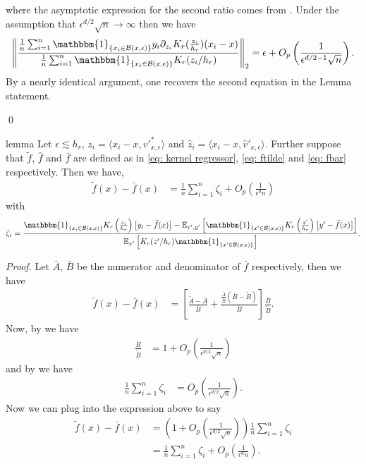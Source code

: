 \documentclass[11pt]{article}
\begin{document}
where the asymptotic expression for the second ratio comes from . Under the assumption that $\epsilon^{d/2}\sqrt{n} \rightarrow \infty$ then we have 
\begin{align}
    \left\|\frac{\frac{1}{n}\sum_{i = 1}^n\mathbbm{1}_{\{x_i \in \mathcal{B}(x, \epsilon)\}}y_i\partial_{z_i}K_r(\frac{z_i}{h_r})(x_i - x)}{\frac{1}{n}\sum_{i = 1}^n\mathbbm{1}_{\{x_i \in \mathcal{B}(x, \epsilon)\}}K_r(z_i/h_r)}\right\|_2 = \epsilon + O_p\left(\frac{1}{\epsilon^{d/2-1}\sqrt{n}}\right).
\end{align}
By a nearly identical argument, one recovers the second equation in the Lemma statement.

\qed{}

\begin{restatable}{lemma}{} \label{lemma: ftilde minus fbar}
    Let $\epsilon \lesssim h_r$, $z_i = \langle x_i - x, v'^*_{x, \epsilon}\rangle$ and $\hat{z}_i = \langle x_i - x, \hat{v}'_{x, \epsilon}\rangle$. Further suppose that $\tilde{f}$, $\hat{f}$ and $\bar{f}$ are defined as in \cref{eq: kernel regressor}, \cref{eq: ftilde} and \cref{eq: fbar} respectively. Then we have,
    \begin{align}
        \tilde{f}(x) - \bar{f}(x) &= \frac{1}{n}\sum_{i = 1}^n\zeta_i + O_p\left(\frac{1}{\epsilon^{d}n}\right) 
    \end{align}
    with 
    \begin{equation}
        \zeta_i = \frac{\mathbbm{1}_{\{x_i \in \mathcal{B}(x, \epsilon)\}}K_r\left(\frac{z_i}{h_r}\right)\left[y_i - \bar{f}(x)\right] - \mathbb{E}_{x', y'}\left[\mathbbm{1}_{\{x' \in \mathcal{B}(x, \epsilon)\}}K_r\left(\frac{z'}{h_r}\right)\left[y' - \bar{f}(x)\right]\right]}{\mathbb{E}_{x'}\left[K_r(z'/h_r)\mathbbm{1}_{\{x'\in \mathcal{B}(x, \epsilon)\}}\right]}. \label{eq: zeta definition}
    \end{equation}
\end{restatable}
\noindent \textit{Proof.} Let $\bar{A}$, $\bar{B}$ be the numerator and denominator of $\bar{f}$ respectively, then we have
\begin{align}
    \tilde{f}(x) - \bar{f}(x) &=  \left[\frac{\tilde{A}-\bar{A}}{\bar{B}} + \frac{\frac{\bar{A}}{\bar{B}}\left(\bar{B} - \tilde{B}\right)}{\bar{B}}\right]\frac{\bar{B}}{\tilde{B}}. 
\end{align}
Now, by  we have
\begin{align}
    \frac{\bar{B}}{\tilde{B}} &= 1 + O_p\left(\frac{1}{\epsilon^{d/2}\sqrt{n}}\right)
\end{align}
and by  we have
\begin{align}
     \frac{1}{n} \sum_{i = 1}^n \zeta_i&=  O_p\left(\frac{1}{\epsilon^{d/2}\sqrt{n}}\right).
\end{align}
Now we can plug into the expression above to say
\begin{align}
    \tilde{f}(x) - \bar{f}(x) &= \left(1 + O_p\left(\frac{1}{\epsilon^{d/2}\sqrt{n}}\right)\right)\frac{1}{n}\sum_{i = 1}^n\zeta_i \\
    &= \frac{1}{n}\sum_{i = 1}^n\zeta_i + O_p\left(\frac{1}{\epsilon^dn}\right). \label{eq: ftilde fbar decomp}
\end{align}
\end{document}

